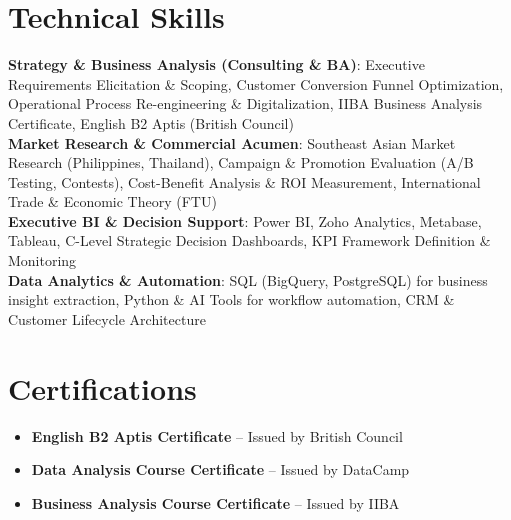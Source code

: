 \documentclass[letterpaper,11pt]{article}
\newcommand{\resumeItem}[1]{
  \item\small{
    {#1 \vspace{1pt}}
  }
}
\newcommand{\resumeItemListStart}{\begin{itemize}[leftmargin=0.15in, itemsep=2.5pt, topsep=2pt, parsep=1.5pt]}
\newcommand{\resumeItemListEnd}{\end{itemize}\vspace{2pt}}
\begin{document}
\section*{Technical Skills}
 \begin{itemize}[leftmargin=0.15in, label={}]
    \small{\item{
     \textbf{Strategy \& Business Analysis (Consulting \& BA)}: {Executive Requirements Elicitation \& Scoping, Customer Conversion Funnel Optimization, Operational Process Re-engineering \& Digitalization, IIBA Business Analysis Certificate, English B2 Aptis (British Council)} \\ \vspace{2pt}
     \textbf{Market Research \& Commercial Acumen}: {Southeast Asian Market Research (Philippines, Thailand), Campaign \& Promotion Evaluation (A/B Testing, Contests), Cost-Benefit Analysis \& ROI Measurement, International Trade \& Economic Theory (FTU)} \\ \vspace{2pt}
     \textbf{Executive BI \& Decision Support}: {Power BI, Zoho Analytics, Metabase, Tableau, C-Level Strategic Decision Dashboards, KPI Framework Definition \& Monitoring} \\ \vspace{2pt}
     \textbf{Data Analytics \& Automation}: {SQL (BigQuery, PostgreSQL) for business insight extraction, Python \& AI Tools for workflow automation, CRM \& Customer Lifecycle Architecture}
    }}
 \end{itemize}

\section*{Certifications}
        \resumeItemListStart
      \resumeItem{\textbf{English B2 Aptis Certificate} -- Issued by British Council}
      \resumeItem{\textbf{Data Analysis Course Certificate} -- Issued by DataCamp}
      \resumeItem{\textbf{Business Analysis Course Certificate} -- Issued by IIBA}
      \resumeItemListEnd

\end{document}
